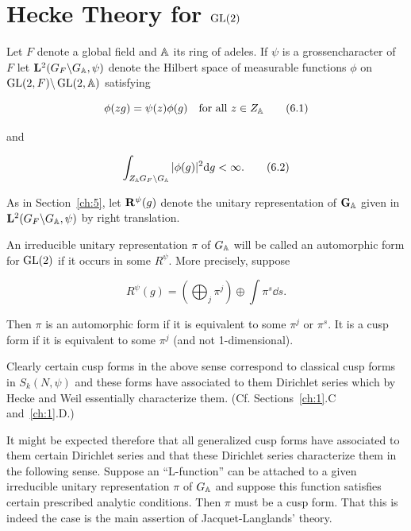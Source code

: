 \chapter{Hecke Theory for \texorpdfstring{$\operatorname{GL}(2)$}{GL(2)}}

\label{ch:6}

Let $F$ denote a global field and $\mathbb{A}$ its ring of adeles. If $\psi$ is a grossencharacter of $F$ let $\mathbf{L}^{2}(G_F \backslash G_{\mathbb{A}}, \psi)$ denote the Hilbert space of measurable functions $\phi$ on $\operatorname{GL}(2, F) \backslash \operatorname{GL}(2, \mathbb{A})$ satisfying

\begin{equation}\label{eq:6.1}
\phi(zg) = \psi(z)\phi(g) \quad \text{for all } z \in Z_{\mathbb{A}}\tag{6.1}
\end{equation}

and

\begin{equation}\label{eq:6.2}
\int_{Z_{\mathbb{A}}G_F \backslash G_{\mathbb{A}}} |\phi(g)|^2 \mathrm{d} g < \infty.\tag{6.2}
\end{equation}

As in Section~\ref{ch:5}, let $\mathbf{R}^{\psi}(g)$ denote the unitary representation of $\mathbf{G}_{\mathbb{A}}$ given in $\mathbf{L}^2(G_F \backslash G_{\mathbb{A}}, \psi)$ by right translation.

\begin{definition}\label{def:6.1}

An irreducible unitary representation $\pi$ of $G_{\mathbb{A}}$ will be called an automorphic form for $\operatorname{GL}(2)$ if it occurs in some $R^{\psi}$. More precisely, suppose

\begin{equation}\label{eq:6.3}
R^{\psi}(g) = \left(\bigoplus_j \pi^j\right) \oplus \int \pi^s \dd s.\tag{6.3}
\end{equation}

Then $\pi$ is an automorphic form if it is equivalent to some $\pi^j$ or $\pi^s$. It is a cusp form if it is equivalent to some $\pi^j$ (and not 1-dimensional).

\end{definition}

Clearly certain cusp forms in the above sense correspond to classical cusp forms in $S_k(N,\psi)$ and these forms have associated to them Dirichlet series which by Hecke and Weil essentially characterize them. (Cf. Sections~\ref{ch:1}.C and~\ref{ch:1}.D.)

It might be expected therefore that all generalized cusp forms have associated to them certain Dirichlet series and that these Dirichlet series characterize them in the following sense. Suppose an ``L-function'' can be attached to a given irreducible unitary representation $\pi$ of $G_{\mathbb{A}}$ and suppose this function satisfies certain prescribed analytic conditions. Then $\pi$ must be a cusp form. That this is indeed the case is the main assertion of Jacquet-Langlands' theory.

